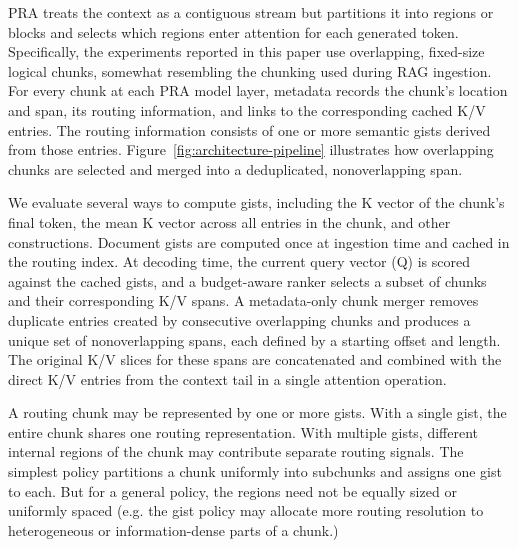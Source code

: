 \documentclass[11pt]{article}
\begin{document}
PRA treats the context as a contiguous stream but partitions it into regions or blocks and
selects which regions enter attention for each generated token. Specifically, the
experiments reported in this paper use overlapping, fixed-size logical chunks, somewhat
resembling the chunking used during RAG ingestion. For every chunk at each PRA model layer,
metadata records the chunk's location and span, its routing information, and links to the
corresponding cached K/V entries. The routing information consists of one or more semantic
gists derived from those entries.
Figure~\ref{fig:architecture-pipeline} illustrates how overlapping chunks
are selected and merged into a deduplicated, nonoverlapping span.

We evaluate several ways to compute gists, including the K vector of the chunk's final
token, the mean K vector across all entries in the chunk, and other constructions. 
Document gists are computed once at ingestion time and cached in the routing index.
At decoding time, the current query vector (Q) is scored against the cached gists, and a budget-aware
ranker selects a subset of chunks and their corresponding K/V spans. A metadata-only chunk
merger removes duplicate entries created by consecutive overlapping chunks and produces a
unique set of nonoverlapping spans, each defined by a starting offset and length. The
original K/V slices for these spans are concatenated and combined with the direct K/V
entries from the context tail in a single attention operation. 


A routing chunk may be represented by one or more gists. 
With a single gist, the entire chunk shares one routing representation. 
With multiple gists, different internal regions of the chunk may contribute separate
routing signals.
The simplest policy partitions a chunk uniformly into subchunks and assigns one gist to each. 
But for a general policy, the regions need not be equally sized or uniformly spaced
(e.g. the gist policy may allocate more routing resolution to heterogeneous or
information-dense parts of a chunk.) 

\end{document}

